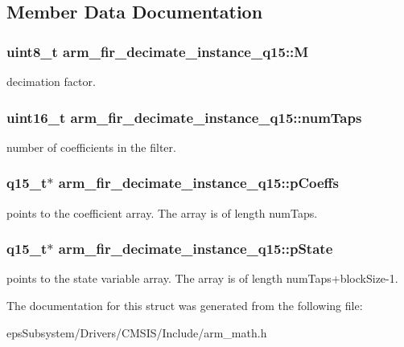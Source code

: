 \subsection{Member Data Documentation}
\hypertarget{structarm__fir__decimate__instance__q15_aad9320284218b3aa378527ea518cf093}{
\subsubsection[{M}]{\setlength{\rightskip}{0pt plus 5cm}uint8\-\_\-t arm\-\_\-fir\-\_\-decimate\-\_\-instance\-\_\-q15\-::\-M}}\label{structarm__fir__decimate__instance__q15_aad9320284218b3aa378527ea518cf093}
decimation factor. \hypertarget{structarm__fir__decimate__instance__q15_ac1e9844488ec717da334fbd4c4f41990}{
\subsubsection[{num\-Taps}]{\setlength{\rightskip}{0pt plus 5cm}uint16\-\_\-t arm\-\_\-fir\-\_\-decimate\-\_\-instance\-\_\-q15\-::num\-Taps}}\label{structarm__fir__decimate__instance__q15_ac1e9844488ec717da334fbd4c4f41990}
number of coefficients in the filter. \hypertarget{structarm__fir__decimate__instance__q15_a01cacab67e73945e8289075598ede14d}{
\subsubsection[{p\-Coeffs}]{\setlength{\rightskip}{0pt plus 5cm}q15\-\_\-t$\ast$ arm\-\_\-fir\-\_\-decimate\-\_\-instance\-\_\-q15\-::p\-Coeffs}}\label{structarm__fir__decimate__instance__q15_a01cacab67e73945e8289075598ede14d}
points to the coefficient array. The array is of length num\-Taps. \hypertarget{structarm__fir__decimate__instance__q15_a3f7b5184bb28853ef401b001df121047}{
\subsubsection[{p\-State}]{\setlength{\rightskip}{0pt plus 5cm}q15\-\_\-t$\ast$ arm\-\_\-fir\-\_\-decimate\-\_\-instance\-\_\-q15\-::p\-State}}\label{structarm__fir__decimate__instance__q15_a3f7b5184bb28853ef401b001df121047}
points to the state variable array. The array is of length num\-Taps+block\-Size-\/1. 

The documentation for this struct was generated from the following file\-:\begin{DoxyCompactItemize}
\item 
eps\-Subsystem/\-Drivers/\-C\-M\-S\-I\-S/\-Include/arm\-\_\-math.\-h\end{DoxyCompactItemize}
